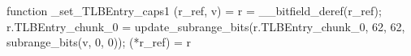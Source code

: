 function _set_TLBEntry_caps1 (r_ref, v) = {
    r = __bitfield_deref(r_ref);
    r.TLBEntry_chunk_0 = update_subrange_bits(r.TLBEntry_chunk_0, 62, 62, subrange_bits(v, 0, 0));
    (*r_ref) = r
}
